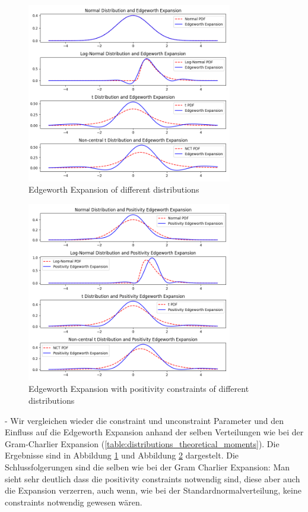 \begin{figure}[h]
    \centering
    \includegraphics[width=0.8\textwidth]{img/ew_expansion.png}
    \caption{Edgeworth Expansion of different distributions}
    \label{fig:ew_expansion}
\end{figure}

\begin{figure}[h]
    \centering
    \includegraphics[width=0.8\textwidth]{img/ew_positivity_expansion.png}
    \caption{Edgeworth Expansion with positivity constraints of different distributions}
    \label{fig:ew_positivity_expansion}
\end{figure}

- Wir vergleichen wieder die constraint und unconstraint Parameter und den Einfluss auf die Edgeworth Expansion anhand der selben Verteilungen wie bei der Gram-Charlier Expansion (\ref{table:distributions_theoretical_moments}). Die Ergebnisse sind in Abbildung \ref{fig:ew_expansion} und Abbildung \ref{fig:ew_positivity_expansion} dargestelt. Die Schlussfolgerungen sind die selben wie bei der Gram Charlier Expansion: Man sieht sehr deutlich dass die positivity constraints notwendig sind, diese aber auch die Expansion verzerren, auch wenn, wie bei der Standardnormalverteilung, keine constraints notwendig gewesen wären.

